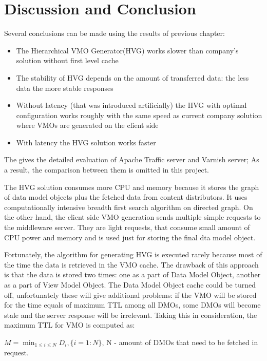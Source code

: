 \newpage
\section{Discussion and Conclusion}
	
Several conclusions can be made using the results of previous chapter: 

\begin{itemize}
	\item The Hierarchical VMO Generator(HVG) works slower than company's solution without first level cache
	\item The stability of HVG depends on the amount of transferred data: the less data the more stable responses
	\item Without latency (that was introduced artificially) the HVG with optimal configuration works roughly with the same speed as current company solution where VMOs are generated on the client side
	\item With latency the HVG solution works faster 
\end{itemize}

The \cite{VarnApacheReverse} gives the detailed evaluation of Apache Traffic server and Varnish server; As a result, the comparison between them is omitted in this project. 

The HVG solution consumes more CPU and memory because it stores the graph of data model objects plus the fetched data from content distributors. It uses computationally intensive breadth first search algorithm on directed graph. On the other hand, the client side VMO generation sends multiple simple requests to the middleware server. They are light requests, that consume small amount of CPU power and memory and is used just for storing the final dta model object.

Fortunately, the algorithm for generating HVG is executed rarely because most of the time the data is retrieved in the VMO cache. The drawback of this approach is that the data is stored two times: one as a part of Data Model Object, another as a part of View Model Object. The Data Model Object cache could be turned off, unfortunately these will give additional problems: if the VMO will be stored for the time equals of maximum TTL among all DMOs, some DMOs will become stale and the server response will be irrelevant. Taking this in consideration, the maximum TTL for VMO is computed as:

\begin{center}
	\begin{math}M = \min_{1 \leq i \leq N} D_{i},\{i=1:N\}\end{math}, N - amount of DMOs that need to be fetched in request.
\end{center}

